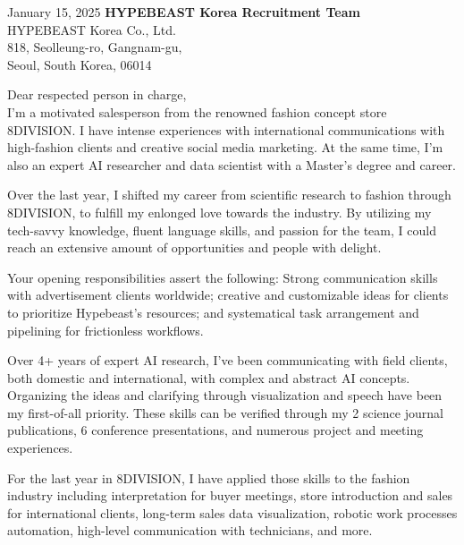 \documentclass[a4paper,10pt]{extarticle}
\begin{document}
\pagestyle{empty}

\pagebreak
\hspace{0pt}
\vfill

\begin{spacing}{1.2}
	\normalsize January 15, 2025 \hfill\large\textbf{HYPEBEAST Korea Recruitment Team}\\
	\normalsize \null\hfill HYPEBEAST Korea Co., Ltd.\\
	\normalsize \null\hfill 818, Seolleung-ro, Gangnam-gu,\\
	\null\hfill Seoul, South Korea, 06014\\
\end{spacing}

Dear respected person in charge,\\

I'm a motivated salesperson from the renowned fashion concept store 8DIVISION. I have intense experiences with international communications with high-fashion clients and creative social media marketing. At the same time, I'm also an expert AI researcher and data scientist with a Master's degree and career.

Over the last year, I shifted my career from scientific research to fashion through 8DIVISION, to fulfill my enlonged love towards the industry. By utilizing my tech-savvy knowledge, fluent language skills, and passion for the team, I could reach an extensive amount of opportunities and people with delight.

Your opening responsibilities assert the following: Strong communication skills with advertisement clients worldwide; creative and customizable ideas for clients to prioritize Hypebeast’s resources; and systematical task arrangement and pipelining for frictionless workflows.

Over 4+ years of expert AI research, I've been communicating with field clients, both domestic and international, with complex and abstract AI concepts. Organizing the ideas and clarifying through visualization and speech have been my first-of-all priority. These skills can be verified through my 2 science journal publications, 6 conference presentations, and numerous project and meeting experiences.

For the last year in 8DIVISION, I have applied those skills to the fashion industry including interpretation for buyer meetings, store introduction and sales for international clients, long-term sales data visualization, robotic work processes automation, high-level communication with technicians, and more.
\end{document}
